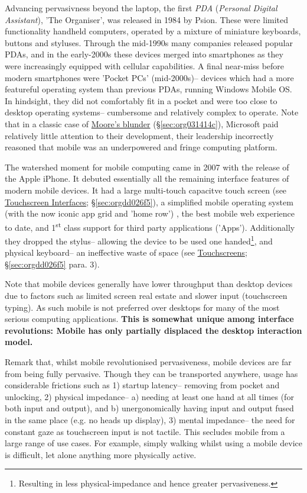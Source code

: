 \documentclass[logo,bsc,singlespacing,parskip]{infthesis}
\begin{document}
Advancing pervasivness beyond the laptop, the first \emph{PDA} (\emph{Personal Digital Assistant}), 'The Organiser', was released in 1984 by Psion.
These were limited functionality handheld computers, operated by a mixture of miniature keyboards, buttons and styluses.
Through the mid-1990s many companies released popular PDAs, and in the early-2000s these devices merged into smartphones as they were increasingly equipped with cellular capabilities.
A final near-miss before modern smartphones were 'Pocket PCs' (mid-2000s)-- devices which had a more featureful operating system than previous PDAs, running Windows Mobile OS.
In hindsight, they did not comfortably fit in a pocket and were too close to desktop operating systems-- cumbersome and relatively complex to operate.
Note that in a classic case of \hyperref[sec:org031414c]{Moore's blunder} (\S \ref{sec:org031414c}), Microsoft paid relatively little attention to their development, their leadership incorrectly reasoned that mobile was an underpowered and fringe computing platform.

The watershed moment for mobile computing came in 2007 with the release of the Apple iPhone.
It debuted essentially all the remaining interface features of modern mobile devices.
It had a large multi-touch capacitve touch screen (see \hyperref[sec:orgdd026f5]{Touchscreen Interfaces}; \S \ref{sec:orgdd026f5}), a simplified mobile operating system (with the now iconic app grid and 'home row')  , the best mobile web experience to date, and 1\textsuperscript{st} class support for third party applications ('Apps').
Additionally they dropped the stylus-- allowing the device to be used one handed\footnote{Resulting in less physical-impedance and hence greater pervasiveness.}, and physical keyboard-- an ineffective waste of space (see \hyperref[sec:orgdd026f5]{Touchscreens}; \S \ref{sec:orgdd026f5} para. 3).

Note that mobile devices generally have lower throughput than desktop devices due to factors such as limited screen real estate and slower input (touchscreen typing).
As such mobile is not preferred over desktops for many of the most serious computing applications.
\textbf{This is somewhat unique among interface revolutions: Mobile has only partially displaced the desktop interaction model.}

Remark that, whilst mobile revolutionised pervasiveness, mobile devices are far from being fully pervasive.
Though they can be transported anywhere, usage has considerable frictions such as 1) startup latency-- removing from pocket and unlocking, 2) physical impedance-- a) needing at least one hand at all times (for both input and output), and b) unergonomically having input and output fused in the same place (e.g. no heads up display), 3) mental impedance-- the need for constant gaze as touchscreen input is not tactile.
This secludes mobile from a large range of use cases.
For example, simply walking whilst using a mobile device is difficult, let alone anything more physically active.
\end{document}

